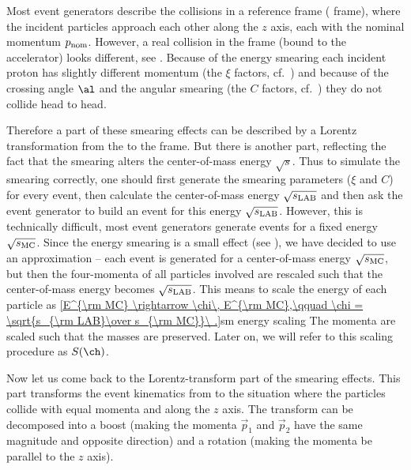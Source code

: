 Most event generators describe the collisions in a reference frame ( frame), where the incident particles approach each other along the $z$ axis, each with the nominal momentum $p_{\rm nom}$. However, a real collision in the  frame (bound to the accelerator) looks different, see . Because of the energy smearing each incident proton has slightly different momentum (the $\xi$ factors, cf.~) and because of the crossing angle $\al$ and the angular smearing (the $C$ factors, cf.~) they do not collide head to head.


Therefore a part of these smearing effects can be described by a Lorentz transformation from the  to the  frame. But there is another part, reflecting the fact that the smearing alters the center-of-mass energy $\sqrt s$. Thus to simulate the smearing correctly, one should first generate the smearing parameters ($\xi$ and $C$) for every event, then calculate the center-of-mass energy $\sqrt{s_{\rm LAB}}$ and then ask the event generator to build an event for this energy $\sqrt{s_{\rm LAB}}$. However, this is technically difficult, most event generators generate events for a fixed energy $\sqrt{s_{\rm MC}}$. Since the energy smearing is a small effect (see ), we have decided to use an approximation -- each event is generated for a center-of-mass energy $\sqrt{s_{\rm MC}}$, but then the four-momenta of all particles involved are rescaled such that the center-of-mass energy becomes $\sqrt{s_{\rm LAB}}$. This means to scale the energy of each particle as
\eqref{E^{\rm MC} \rightarrow \chi\, E^{\rm MC},\qquad \chi = \sqrt{s_{\rm LAB}\over s_{\rm MC}}\ .}{sm energy scaling}
The momenta are scaled such that the masses are preserved. Later on, we will refer to this scaling procedure as $S(\ch)$.

Now let us come back to the Lorentz-transform part of the smearing effects. This part transforms the event kinematics from  to the situation where the particles collide with equal momenta and along the $z$ axis. The transform can be decomposed into a boost (making the momenta $\vec p_1$ and $\vec p_2$ have the same magnitude and opposite direction) and a rotation (making the momenta be parallel to the $z$ axis).

